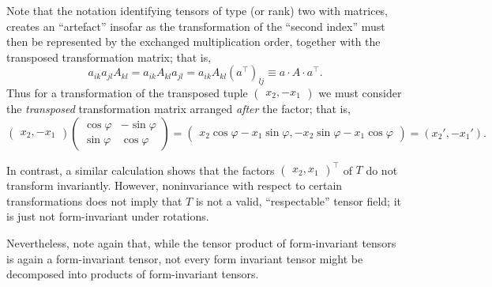 {Note that  the notation identifying tensors of type (or rank) two with matrices,
creates an ``artefact'' insofar as the transformation of the ``second index'' must then be represented by
the exchanged multiplication order, together with the transposed transformation matrix;
that is,
$$
a_{ik}a_{jl}A_{kl}
=  a_{ik}A_{kl}a_{jl}
=  a_{ik}A_{kl}\left(a^\intercal  \right)_{lj}
\equiv a\cdot A\cdot a^\intercal  .
$$
Thus for a
transformation  of
the transposed tuple  $\begin{pmatrix}   {  x}_2 ,- {  x}_1  \end{pmatrix}$
we must consider the {\em transposed} transformation matrix arranged {\em after} the factor; that is,
$$
\begin{pmatrix}  {  x}_2 , - {  x}_1 \end{pmatrix}
\begin{pmatrix}  \cos \varphi & -\sin \varphi  \\
  \sin \varphi & \cos \varphi
\end{pmatrix}
=
\begin{pmatrix}
{  x}_2 \cos \varphi  - x_1 \sin \varphi ,
 - x_2 \sin \varphi         - {  x}_1 \cos \varphi
\end{pmatrix}
=
\left(
{  x}_2'  ,
 - {  x}_1'
\right).
$$



In contrast, a similar calculation shows that the factors
$\begin{pmatrix}  {  x}_2 ,  {  x}_1  \end{pmatrix} ^\intercal $
of $T$ do not transform invariantly.
However, noninvariance with respect to certain transformations does not imply that
$T$ is not a valid, ``respectable'' tensor field; it is just not form-invariant under rotations.
\eexample
}

Nevertheless, note again that, while the tensor product of form-invariant tensors is again a form-invariant tensor,  not every form
invariant tensor might be decomposed into products of form-invariant tensors.


